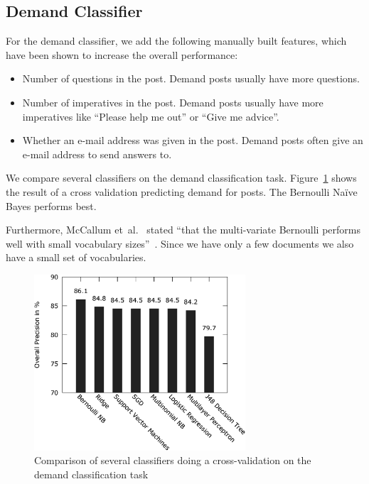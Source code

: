 \subsection{Demand Classifier}
For the demand classifier, we add the following manually built features, which have been shown to increase the overall performance:
\begin{itemize}
	\item Number of questions in the post. Demand posts usually have more questions.
	\item Number of imperatives in the post. Demand posts usually have more imperatives like ``Please help me out'' or ``Give me advice''.
	\item Whether an e-mail address was given in the post. Demand posts often give an e-mail address to send answers to.
\end{itemize}

We compare several classifiers on the demand classification task.
Figure~\ref{fig:compare-demand} shows the result of a cross validation predicting demand for posts.
The Bernoulli Na\"{i}ve Bayes performs best.

Furthermore, McCallum et~al.~\cite{mccallum1998comparison} stated ``that the multi-variate Bernoulli performs well with small vocabulary sizes''~\cite{mccallum1998comparison}.
Since we have only a few documents we also have a small set of vocabularies.

\begin{figure}
	\begin{center}
		\includegraphics[width=0.7\textwidth]{figures/compare_demand_classifiers.eps}
	\end{center}
	\caption{Comparison of several classifiers doing a cross-validation on the demand classification task}
	\label{fig:compare-demand}
\end{figure}

